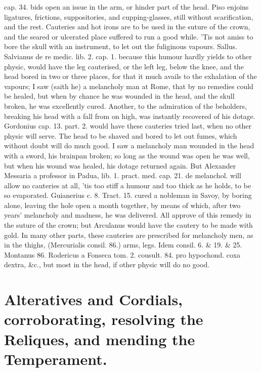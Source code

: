 cap. 34. bids open an issue in the arm, or hinder part of the head.
Piso enjoins ligatures, frictions, suppositories, and
cupping-glasses, still without scarification, and the rest.
Cauteries and hot irons are to be used in the suture of the
crown, and the seared or ulcerated place suffered to run a good while.
'Tis not amiss to bore the skull with an instrument, to let out the
fuliginous vapours. Sallus. Salvianus de re medic. lib. 2. cap. 1.
because this humour hardly yields to other physic, would have the
leg cauterised, or the left leg, below the knee, and the head
bored in two or three places, for that it much avails to the exhalation
of the vapours;  I saw (saith he) a melancholy man at Rome, that
by no remedies could be healed, but when by chance he was wounded in
the head, and the skull broken, he was excellently cured. Another, to
the admiration of the beholders, breaking his head with a fall
from on high, was instantly recovered of his dotage. Gordonius cap. 13.
part. 2. would have these cauteries tried last, when no other physic
will serve.  The head to be shaved and bored to let out fumes,
which without doubt will do much good. I saw a melancholy man wounded
in the head with a sword, his brainpan broken; so long as the wound was
open he was well, but when his wound was healed, his dotage returned
again. But Alexander Messaria a professor in Padua, lib. 1. pract. med.
cap. 21. de melanchol. will allow no cauteries at all, 'tis too stiff a
humour and too thick as he holds, to be so evaporated.
Guianerius c. 8. Tract. 15. cured a nobleman in Savoy, by boring alone,
leaving the hole open a month together, by means of which, after
two years' melancholy and madness, he was delivered. All approve of
this remedy in the suture of the crown; but Arculanus would have the
cautery to be made with gold. In many other parts, these cauteries are
prescribed for melancholy men, as in the thighs, (Mercurialis consil.
86.) arms, legs. Idem consil. 6. \& 19. \& 25. Montanus 86. Rodericus a
Fonseca tom. 2. cousult. 84. pro hypochond. coxa dextra, \&c., but most
in the head, if other physic will do no good.

\section[Alternatives and Cordials]{Alteratives and Cordials, corroborating, resolving the Reliques, and mending the Temperament.}

